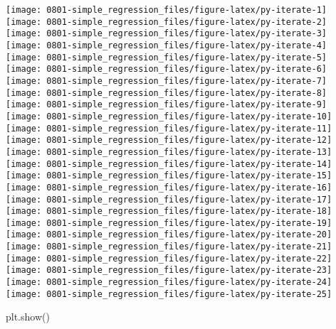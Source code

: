 \documentclass[]{book}
\newenvironment{Shaded}{\begin{snugshade}}{\end{snugshade}}
\newcommand{\NormalTok}[1]{#1}
\begin{document}
\texttt{[image: 0801-simple\_regression\_files/figure-latex/py-iterate-1]} \texttt{[image: 0801-simple\_regression\_files/figure-latex/py-iterate-2]} \texttt{[image: 0801-simple\_regression\_files/figure-latex/py-iterate-3]} \texttt{[image: 0801-simple\_regression\_files/figure-latex/py-iterate-4]} \texttt{[image: 0801-simple\_regression\_files/figure-latex/py-iterate-5]} \texttt{[image: 0801-simple\_regression\_files/figure-latex/py-iterate-6]} \texttt{[image: 0801-simple\_regression\_files/figure-latex/py-iterate-7]} \texttt{[image: 0801-simple\_regression\_files/figure-latex/py-iterate-8]} \texttt{[image: 0801-simple\_regression\_files/figure-latex/py-iterate-9]} \texttt{[image: 0801-simple\_regression\_files/figure-latex/py-iterate-10]} \texttt{[image: 0801-simple\_regression\_files/figure-latex/py-iterate-11]} \texttt{[image: 0801-simple\_regression\_files/figure-latex/py-iterate-12]} \texttt{[image: 0801-simple\_regression\_files/figure-latex/py-iterate-13]} \texttt{[image: 0801-simple\_regression\_files/figure-latex/py-iterate-14]} \texttt{[image: 0801-simple\_regression\_files/figure-latex/py-iterate-15]} \texttt{[image: 0801-simple\_regression\_files/figure-latex/py-iterate-16]} \texttt{[image: 0801-simple\_regression\_files/figure-latex/py-iterate-17]} \texttt{[image: 0801-simple\_regression\_files/figure-latex/py-iterate-18]} \texttt{[image: 0801-simple\_regression\_files/figure-latex/py-iterate-19]} \texttt{[image: 0801-simple\_regression\_files/figure-latex/py-iterate-20]} \texttt{[image: 0801-simple\_regression\_files/figure-latex/py-iterate-21]} \texttt{[image: 0801-simple\_regression\_files/figure-latex/py-iterate-22]} \texttt{[image: 0801-simple\_regression\_files/figure-latex/py-iterate-23]} \texttt{[image: 0801-simple\_regression\_files/figure-latex/py-iterate-24]} \texttt{[image: 0801-simple\_regression\_files/figure-latex/py-iterate-25]}

\begin{Shaded}
\begin{Highlighting}[]
\NormalTok{plt.show()}
\end{Highlighting}
\end{Shaded}
\end{document}
